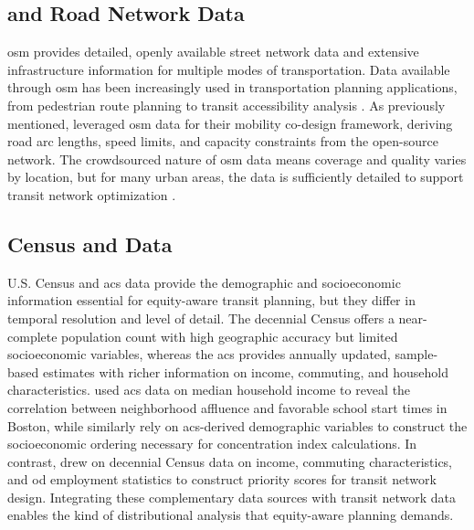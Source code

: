 \subsection{ and Road Network Data}

\Gls{osm} provides detailed, openly available street network data and extensive infrastructure information for multiple modes of transportation. Data available through \gls{osm} has been increasingly used in transportation planning applications, from pedestrian route planning to transit accessibility analysis \cite{openstreetmapwikicontributors2026Routing, liuGeneralizedFrameworkMeasuring2022}. As previously mentioned, \textcite{zardiniCoDesignEnableUserFriendly2023} leveraged \gls{osm} data for their mobility co-design framework, deriving road arc lengths, speed limits, and capacity constraints from the open-source network. The crowdsourced nature of \gls{osm} data means coverage and quality varies by location, but for many urban areas, the data is sufficiently detailed to support transit network optimization \cite{2024Complexity}. 

\subsection{Census and  Data}

U.S. Census and \gls{acs} data provide the demographic and socioeconomic information essential for equity-aware transit planning, but they differ in temporal resolution and level of detail. The decennial Census offers a near-complete population count with high geographic accuracy but limited socioeconomic variables, whereas the \gls{acs} provides annually updated, sample-based estimates with richer information on income, commuting, and household characteristics. \textcite{bertsimasOptimizingSchoolsStart2019} used \gls{acs} data on median household income to reveal the correlation between neighborhood affluence and favorable school start times in Boston, while \textcite{karnerAdvancesPitfallsMeasuring2025} similarly rely on \gls{acs}-derived demographic variables to construct the socioeconomic ordering necessary for concentration index calculations. In contrast, \textcite{paviaDesigningEquitableTransit2023} drew on decennial Census data on income, commuting characteristics, and \gls{od} employment statistics to construct priority scores for transit network design. Integrating these complementary data sources with transit network data enables the kind of distributional analysis that equity-aware planning demands.

